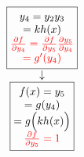 \begin{equation*}
\begin{matrix}
\begin{matrix}
        \boxed{\begin{matrix}
            y_4 = y_2 y_3 \\
            = k h(x) \\
            \color{red}{\frac{\partial f}{\partial y_4} = \frac{\partial f}{\partial y_5}\frac{\partial y_5}{\partial y_4}} \\
            \color{red}{= g'(y_4)}
        \end{matrix}} \\
        \downarrow \\
        \boxed{\begin{matrix}
            f(x) = y_5 \\
            = g(y_4) \\
            = g\Bigl(k h(x) \Bigr) \\
            \color{red}{\frac{\partial f}{\partial y_5} = 1}
        \end{matrix}}
    \end{matrix}
    \end{matrix}
\end{equation*}
